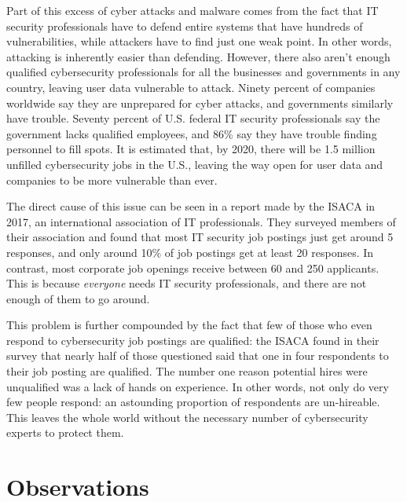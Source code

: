 \documentclass[openright]{report}
\begin{document}
\par Part of this excess of cyber attacks and malware comes from the fact that IT security professionals have to defend entire systems that have hundreds of vulnerabilities, while attackers have to find just one weak point. In other words, attacking is inherently easier than defending. However, there also aren't enough qualified cybersecurity professionals for all the businesses and governments in any country, leaving user data vulnerable to attack. Ninety percent of companies worldwide say they are unprepared for cyber attacks, and governments similarly have trouble. Seventy percent of U.S. federal IT security professionals say the government lacks qualified employees, and 86\% say they have trouble finding personnel to fill spots\cite{fed_cs_jobs}. It is estimated that, by 2020, there will be 1.5 million unfilled cybersecurity jobs in the U.S., leaving the way open for user data and companies to be more vulnerable than ever\cite{why_no_cyber_classes}.

\par The direct cause of this issue can be seen in a report made by the ISACA in 2017, an international association of IT professionals. They surveyed members of their association and found that most IT security job postings just get around 5 responses, and only around 10\% of job postings get at least 20 responses. In contrast, most corporate job openings receive between 60 and 250 applicants\cite{job_survey}. This is because \textit{everyone} needs IT security professionals, and there are not enough of them to go around.

\par This problem is further compounded by the fact that few of those who even respond to cybersecurity job postings are qualified: the ISACA found in their survey that nearly half of those questioned said that one in four respondents to their job posting are qualified. The number one reason potential hires were unqualified was a lack of hands on experience\cite{job_survey}. In other words, not only do very few people respond: an astounding proportion of respondents are un-hireable. This leaves the whole world without the necessary number of cybersecurity experts to protect them.

\section{Observations}
\end{document}
